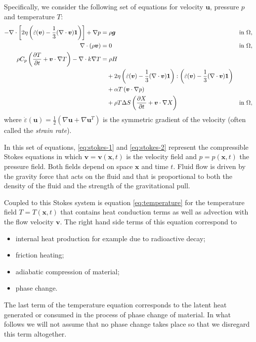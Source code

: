 Specifically, we consider the following set of equations for velocity $\mathbf
u$, pressure $p$ and temperature $T$:
\begin{align}
  \label{eq:stokes-1}
  -\nabla \cdot \left[2\eta \left(\dot\varepsilon(\bm v)
                                  - \frac{1}{3}(\nabla \cdot \bm v)\mathbf 1\right)
                \right] + \nabla p &=
  \rho \bm g
  &
  & \textrm{in $\Omega$},
  \\
  \label{eq:stokes-2}
  \nabla \cdot (\rho \bm v) &= 0
  &
  & \textrm{in $\Omega$},
  \\
  \label{eq:temperature}
  \rho C_p \left(\frac{\partial T}{\partial t} + \bm v\cdot\nabla T\right)
  - \nabla\cdot k\nabla T
  &=
  \rho H
  \notag
  \\
  &\quad
  +
  2\eta
  \left(\dot\varepsilon(\bm v) - \frac{1}{3}(\nabla \cdot \bm v)\mathbf 1\right)
  :
  \left(\dot\varepsilon(\bm v) - \frac{1}{3}(\nabla \cdot \bm v)\mathbf 1\right)
  \\
  &\quad
  +\alpha T \left( \bm v \cdot \nabla p \right)
  \notag
  \\
  &\quad
  + \rho T \Delta S \left(\frac{\partial X}{\partial t} + \bm v\cdot\nabla X\right)
  &
  & \textrm{in $\Omega$},
  \notag
\end{align}
where $\dot\varepsilon(\mathbf u) = \frac{1}{2}(\nabla \mathbf u + \nabla\mathbf
u^T)$ is the symmetric gradient of the velocity (often called the
\textit{strain rate}).%

In this set of equations, \eqref{eq:stokes-1} and \eqref{eq:stokes-2}
represent the compressible Stokes equations in which $\mathbf v=\mathbf
v(\mathbf x,t)$ is the velocity field and $p=p(\mathbf x,t)$ the pressure
field. Both fields depend on space $\mathbf x$ and time $t$. Fluid flow is
driven by the gravity force that acts on the fluid and that is proportional to
both the density of the fluid and the strength of the gravitational pull.

Coupled to this Stokes system is equation \eqref{eq:temperature} for the
temperature field $T=T(\mathbf x,t)$ that contains heat conduction terms as
well as advection with the flow velocity $\mathbf v$. The right hand side
terms of this equation correspond to
\begin{itemize}
\item internal heat production for example due to radioactive decay;
\item friction heating;
\item adiabatic compression of material;
\item phase change.
\end{itemize}
The last term of the temperature equation corresponds to
the latent heat generated or consumed in the process of phase change of material. 
In what follows we will not assume that no phase change takes place so that we disregard this term 
altogether.

